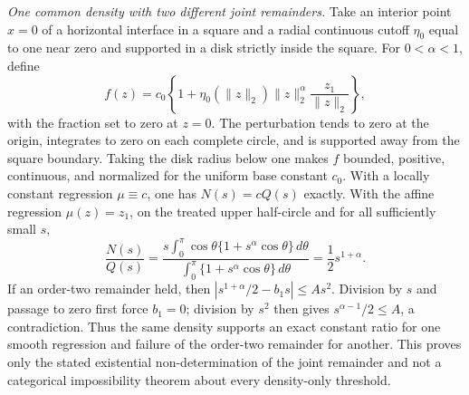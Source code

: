 \emph{One common density with two different joint remainders.}
Take an interior point \(x=0\) of a horizontal interface in a square and a radial continuous cutoff \(\eta_0\) equal to one near zero and supported in a disk strictly inside the square.  For \(0<\alpha<1\), define
\[
f(z)=c_0\left\{1+\eta_0(\lVert z\rVert_2)\lVert z\rVert_2^\alpha\frac{z_1}{\lVert z\rVert_2}\right\},
\]
with the fraction set to zero at \(z=0\).  The perturbation tends to zero at the origin, integrates to zero on each complete circle, and is supported away from the square boundary.  Taking the disk radius below one makes \(f\) bounded, positive, continuous, and normalized for the uniform base constant \(c_0\).  With a locally constant regression \(\mu\equiv c\), one has \(N(s)=cQ(s)\) exactly.  With the affine regression \(\mu(z)=z_1\), on the treated upper half-circle and for all sufficiently small \(s\),
\[
\frac{N(s)}{Q(s)}
=\frac{s\int_0^\pi\cos\theta\{1+s^\alpha\cos\theta\}\,d\theta}
{\int_0^\pi\{1+s^\alpha\cos\theta\}\,d\theta}
=\frac12s^{1+\alpha}.
\]
If an order-two remainder held, then \(|s^{1+\alpha}/2-b_1s|\leq As^2\).  Division by \(s\) and passage to zero first force \(b_1=0\); division by \(s^2\) then gives \(s^{\alpha-1}/2\leq A\), a contradiction.  Thus the same density supports an exact constant ratio for one smooth regression and failure of the order-two remainder for another.  This proves only the stated existential non-determination of the joint remainder and not a categorical impossibility theorem about every density-only threshold.